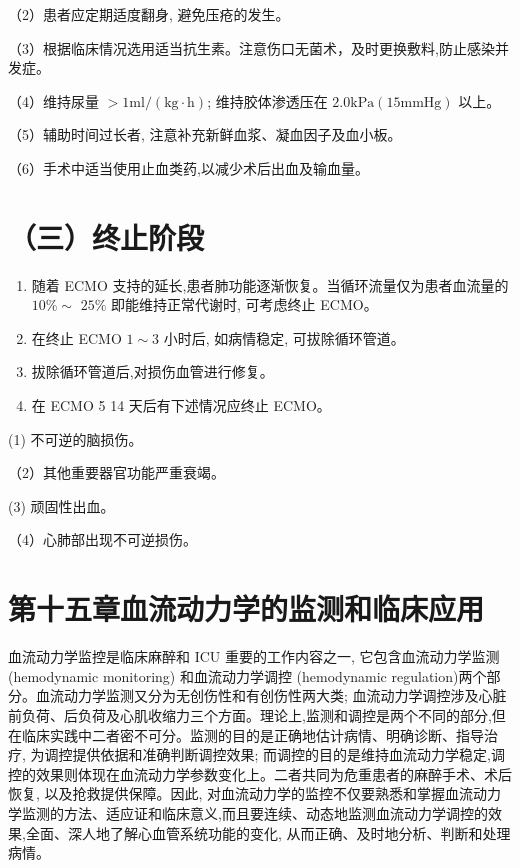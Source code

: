 \documentclass[10pt]{article}
\begin{document}
（2）患者应定期适度翻身, 避免压疮的发生。

（3）根据临床情况选用适当抗生素。注意伤口无菌术，及时更换敷料,防止感染并发症。

（4）维持尿量 $>1 \mathrm{ml} /(\mathrm{kg} \cdot \mathrm{h})$; 维持胶体渗透压在 $2.0 \mathrm{kPa}(15 \mathrm{mmHg})$ 以上。

（5）辅助时间过长者, 注意补充新鲜血浆、凝血因子及血小板。

（6）手术中适当使用止血类药,以减少术后出血及输血量。

\section*{（三）终止阶段}
\begin{enumerate}
  \item 随着 ECMO 支持的延长,患者肺功能逐渐恢复。当循环流量仅为患者血流量的 $10 \% \sim$ $25 \%$ 即能维持正常代谢时, 可考虑终止 ECMO。

  \item 在终止 ECMO $1 \sim 3$ 小时后, 如病情稳定, 可拔除循环管道。

  \item 拔除循环管道后,对损伤血管进行修复。

  \item 在 ECMO 5 14 天后有下述情况应终止 ECMO。

\end{enumerate}

(1) 不可逆的脑损伤。

（2）其他重要器官功能严重衰竭。

(3) 顽固性出血。

（4）心肺部出现不可逆损伤。

\section*{第十五章血流动力学的监测和临床应用}
血流动力学监控是临床麻醉和 ICU 重要的工作内容之一, 它包含血流动力学监测 (hemodynamic monitoring) 和血流动力学调控 (hemodynamic regulation)两个部分。血流动力学监测又分为无创伤性和有创伤性两大类; 血流动力学调控涉及心脏前负荷、后负荷及心肌收缩力三个方面。理论上,监测和调控是两个不同的部分,但在临床实践中二者密不可分。监测的目的是正确地估计病情、明确诊断、指导治疗, 为调控提供依据和准确判断调控效果; 而调控的目的是维持血流动力学稳定,调控的效果则体现在血流动力学参数变化上。二者共同为危重患者的麻醉手术、术后恢复, 以及抢救提供保障。因此, 对血流动力学的监控不仅要熟悉和掌握血流动力学监测的方法、适应证和临床意义,而且要连续、动态地监测血流动力学调控的效果,全面、深人地了解心血管系统功能的变化, 从而正确、及时地分析、判断和处理病情。
\end{document}
